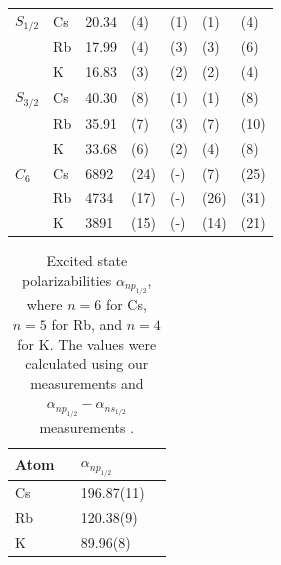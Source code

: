 \documentclass[twocolumn,pra,showpacs,superscriptaddress,longbibliography]{revtex4-1}   %
\newcommand{\sspace}{$\enspace$}
\begin{document}
\begin{table}
\begin{center}
\begin{tabular}{lllllll}
$S_{1/2}$ 			& Cs & 20.34 & (4) & (1) & (1) & (4) \\
 					& Rb & 17.99 & (4) & (3) & (3) & (6) \\
 					& K  & 16.83 & (3) & (2) & (2) & (4) \\ \hline
$S_{3/2}$ 			& Cs & 40.30 & (8) & (1) & (1) & (8) \\
 					& Rb & 35.91 & (7) & (3) & (7) & (10) \\
 					& K  & 33.68 & (6) & (2) & (4) & (8) \\ \hline
$C_6$ 				& Cs & 6892 & (24) & (-) & (7) & (25) \\ 
					& Rb & 4734 & (17) & (-) & (26) & (31) \\
 					& K  & 3891 & (15) & (-) & (14) & (21) \\ \hline
\hline
\end{tabular}
\end{center}
\end{table}
\endgroup



\begingroup
\begin{table}
\caption{\label{tablePolExcited}Excited state polarizabilities $\alpha_{np_{1/2}}$, where $n = 6$ for Cs, $n = 5$ for Rb, and $n = 4$ for K. The values were calculated using our measurements and $\alpha_{np_{1/2}} - \alpha_{ns_{1/2}}$ measurements \cite{Hunter1991,Miller1994}.}
\begin{center}
\begin{tabular}{l l l}
\hline\hline
Atom \sspace & $\alpha_{np_{1/2}}$ \\
\hline
Cs & 196.87(11) \\
Rb & 120.38(9) \\
K  & 89.96(8) \\
\hline\hline
\end{tabular}
\end{center}
\end{table}
\endgroup
\end{document}
